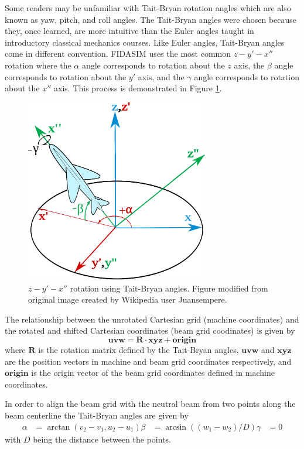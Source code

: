 Some readers may be unfamiliar with Tait-Bryan rotation angles which are also known as yaw, pitch, and roll angles. The Tait-Bryan angles were chosen because they, once learned, are more intuitive than the Euler angles taught in introductory classical mechanics courses. Like Euler angles, Tait-Bryan angles come in different convention. FIDASIM uses the most common $z-y'-x''$ rotation where the $\alpha$ angle corresponds to rotation about the $z$ axis, the $\beta$ angle corresponds to rotation about the $y'$ axis, and the $\gamma$ angle corresponds to rotation about the $x''$ axis. This process is demonstrated in Figure \ref{fig:tait_bryan}.
\begin{figure}[h!]
    \centering
    \includegraphics[width=8cm]{figures/tait_bryan.eps}
    \caption{$z-y'-x''$ rotation using Tait-Bryan angles. Figure modified from original image created by Wikipedia user Juansempere.}
    \label{fig:tait_bryan}
\end{figure}

The relationship between the unrotated Cartesian grid (machine coordinates) and the rotated and shifted Cartesian coordinates (beam grid coodinates) is given by
\begin{equation}\label{eq:xyz_to_uvw}
    \mathbf{uvw} = \mathbf{R}\cdot \mathbf{xyz} + \mathbf{origin}
\end{equation}
where $\mathbf{R}$ is the rotation matrix defined by the Tait-Bryan angles, $\mathbf{uvw}$ and $\mathbf{xyz}$ are the position vectors in machine and beam grid coordinates respectively, and $\mathbf{origin}$ is the origin vector of the beam grid coordinates defined in machine coordinates.

In order to align the beam grid with the neutral beam from two points along the beam centerline the Tait-Bryan angles are given by
\begin{equation}
\begin{split}
    \alpha &= \arctan(v_2 - v_1,u_2 - u_1)
    \beta  &= \arcsin((w_1 - w_2)/D)
    \gamma &= 0
\end{split}
\end{equation}
with $D$ being the distance between the points.

